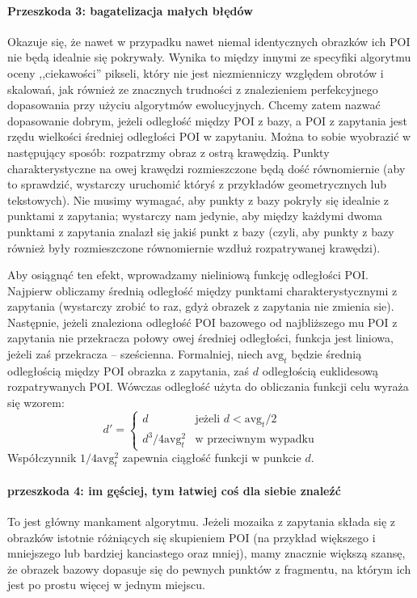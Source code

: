 \documentclass[a4paper,12pt,leqno]{article}
\begin{document}
\paragraph{Przeszkoda 3: bagatelizacja małych błędów}
Okazuje się, że nawet w przypadku nawet niemal identycznych obrazków ich POI nie będą idealnie się pokrywały. Wynika to między innymi ze specyfiki algorytmu oceny
,,ciekawości'' pikseli, który nie jest niezmienniczy względem obrotów i skalowań, jak również ze znacznych trudności z znalezieniem perfekcyjnego dopasowania przy
użyciu algorytmów ewolucyjnych. Chcemy zatem nazwać dopasowanie dobrym, jeżeli odległość między POI z bazy, a POI z zapytania jest rzędu wielkości średniej odległości
POI w zapytaniu. Można to sobie wyobrazić w następujący sposób: rozpatrzmy obraz z ostrą krawędzią. Punkty charakterystyczne na owej krawędzi rozmieszczone będą
dość równomiernie (aby to sprawdzić, wystarczy uruchomić któryś z przykładów geometrycznych lub tekstowych). Nie musimy wymagać, aby punkty z bazy pokryły się idealnie
z punktami z zapytania; wystarczy nam jedynie, aby między każdymi dwoma punktami z zapytania znalazł się jakiś punkt z bazy (czyli, aby punkty z bazy również były
rozmieszczone równomiernie wzdłuż rozpatrywanej krawędzi).

Aby osiągnąć ten efekt, wprowadzamy nieliniową funkcję odległości POI. Najpierw obliczamy średnią odległość między punktami charakterystycznymi z zapytania (wystarczy
zrobić to raz, gdyż obrazek z zapytania nie zmienia sie). Następnie, jeżeli znaleziona odległość POI bazowego od najbliższego mu POI z zapytania nie przekracza połowy
owej średniej odległości, funkcja jest liniowa, jeżeli zaś przekracza -- sześcienna. Formalniej, niech $\mathrm{avg}_t$ będzie średnią odległością między POI obrazka
z zapytania, zaś $d$ odległością euklidesową rozpatrywanych POI. Wówczas odległość użyta do obliczania funkcji celu wyraża się wzorem:
\[ d' = \begin{cases}
	    d & \text{jeżeli } d < \mathrm{avg}_t / 2 \\
	    d^3 / 4\mathrm{avg}_t^2 & \text{w przeciwnym wypadku}
	 \end{cases} \]
Współczynnik $1 / 4\mathrm{avg}_t^2$ zapewnia ciągłość funkcji w punkcie $d$.

\paragraph{przeszkoda 4: im gęściej, tym łatwiej coś dla siebie znaleźć}
To jest główny mankament algorytmu. Jeżeli mozaika z zapytania składa się z obrazków istotnie różniących się skupieniem POI 
(na przykład większego i mniejszego lub bardziej kanciastego oraz mniej), mamy znacznie większą szansę, że obrazek bazowy dopasuje się do pewnych punktów z fragmentu, 
na którym ich jest po prostu więcej w jednym miejscu.
\end{document}

